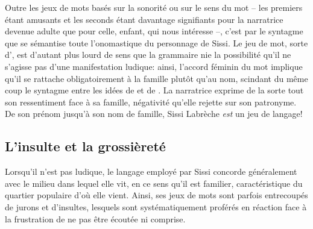 Outre les jeux de mots basés sur la sonorité ou sur le sens du mot  -- les premiers étant amusants et les seconds étant davantage signifiants pour la narratrice devenue adulte que pour celle, enfant, qui nous intéresse --, c'est par le syntagme  que se sémantise toute l'onomastique du personnage de Sissi.
Le jeu de mot, sorte d', est d'autant plus lourd de sens que la grammaire nie la possibilité qu'il ne s'agisse pas d'une manifestation ludique: ainsi, l'accord féminin du mot  implique qu'il se rattache obligatoirement à la famille plutôt qu'au nom, scindant du même coup le syntagme entre les idées de  et de .
La narratrice exprime de la sorte tout son ressentiment face à sa famille, négativité qu'elle rejette sur son patronyme.
De son prénom jusqu'à son nom de famille, Sissi Labrèche \textit{est} un jeu de langage!

\subsection{L'insulte et la grossièreté}
Lorsqu'il n'est pas ludique, le langage employé par Sissi concorde généralement avec le milieu dans lequel elle vit, en ce sens qu'il est familier, caractéristique du quartier populaire d'où elle vient.
Ainsi, ses jeux de mots sont parfois entrecoupés de jurons et d'insultes, lesquels sont systématiquement proférés en réaction face à la frustration de ne pas être écoutée ni comprise.

